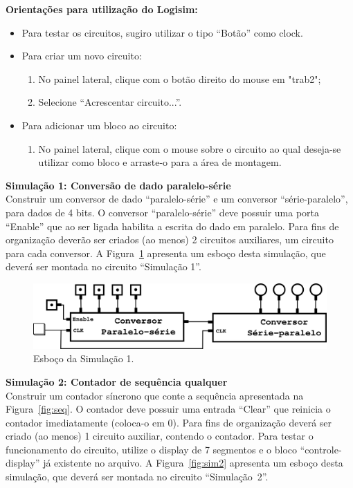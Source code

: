 \documentclass[8pt]{article}
\newcommand{\titulo}[1]{{\bf #1}}
\begin{document}
\noindent
\titulo{Orientações para utilização do Logisim:}
\begin{itemize}
  \item Para testar os circuitos, sugiro utilizar o tipo ``Botão'' como clock.
  \item Para criar um novo circuito:
  \begin{enumerate}
    \item No painel lateral, clique com o botão direito do mouse em "trab2";
    \item Selecione ``Acrescentar circuito...''.
  \end{enumerate}
  \item Para adicionar um bloco ao circuito:
  \begin{enumerate}
    \item No painel lateral, clique com o mouse sobre o circuito ao qual deseja-se utilizar como bloco e arraste-o para a área de montagem.
  \end{enumerate}
\end{itemize}

\newpage
\noindent
\titulo{\large Simulação 1: Conversão de dado paralelo-série} \\
Construir um conversor de dado ``paralelo-série'' e um conversor ``série-paralelo'',
para dados de 4 bits.
O conversor ``paralelo-série'' deve possuir uma porta ``Enable'' que ao ser ligada habilita a escrita do dado em paralelo.
Para fins de organização deverão ser criados (ao menos) 2 circuitos auxiliares, um circuito para cada conversor.
A Figura~\ref{fig:sim1} apresenta um esboço desta simulação, que deverá ser montada no circuito ``Simulação 1''.

\begin{figure}[h]
  \centering
  \includegraphics[scale=0.3]{figs/sim1}
  \caption{Esboço da Simulação 1.}
  \label{fig:sim1}
\end{figure}

\vspace{3mm}
\noindent
\titulo{\large Simulação 2: Contador de sequência qualquer} \\
\noindent
Construir um contador síncrono que conte a sequência apresentada na Figura~\ref{fig:seq}.
O contador deve possuir uma entrada ``Clear'' que reinicia o contador imediatamente (coloca-o em $0$).
Para fins de organização deverá ser criado (ao menos) 1 circuito auxiliar, contendo o contador.
Para testar o funcionamento do circuito, utilize o display de 7 segmentos e o bloco ``controle-display'' já existente no arquivo.
A Figura~\ref{fig:sim2} apresenta um esboço desta simulação, que deverá ser montada no circuito {``Simulação~2''}.
\end{document}
